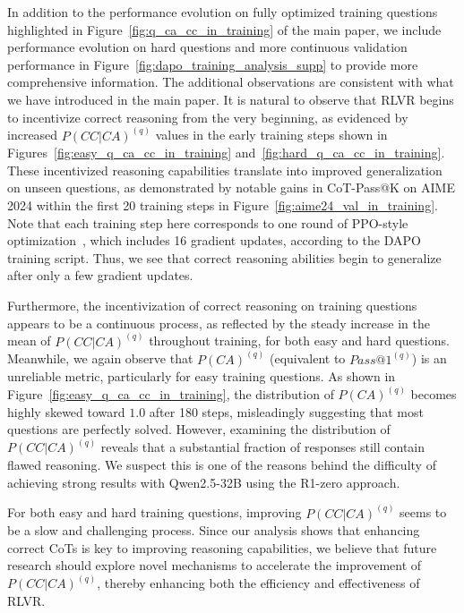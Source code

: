 In addition to the performance evolution on fully optimized training questions highlighted in Figure~\ref{fig:q_ca_cc_in_training} of the main paper, we include performance evolution on hard questions and more continuous validation performance in Figure~\ref{fig:dapo_training_analysis_supp} to provide more comprehensive information.
The additional observations are consistent with what we have introduced in the main paper.
It is natural to observe that RLVR begins to incentivize correct reasoning from the very beginning, as evidenced by increased $P(CC|CA)^{(q)}$ values in the early training steps shown in Figures~\ref{fig:easy_q_ca_cc_in_training} and~\ref{fig:hard_q_ca_cc_in_training}.
These incentivized reasoning capabilities translate into improved generalization on unseen questions, as demonstrated by notable gains in CoT-Pass@K on AIME 2024 within the first 20 training steps in Figure~\ref{fig:aime24_val_in_training}.
Note that each training step here corresponds to one round of PPO-style optimization~\citep{schulman2017PPO}, which includes 16 gradient updates, according to the DAPO training script.
Thus, we see that correct reasoning abilities begin to generalize after only a few gradient updates.

Furthermore, the incentivization of correct reasoning on training questions appears to be a continuous process, as reflected by the steady increase in the mean of $P(CC|CA)^{(q)}$ throughout training, for both easy and hard questions.
Meanwhile, we again observe that $P(CA)^{(q)}$ (equivalent to $Pass@1^{(q)}$) is an unreliable metric, particularly for easy training questions.
As shown in Figure~\ref{fig:easy_q_ca_cc_in_training}, the distribution of $P(CA)^{(q)}$ becomes highly skewed toward $1.0$ after 180 steps, misleadingly suggesting that most questions are perfectly solved.
However, examining the distribution of $P(CC|CA)^{(q)}$ reveals that a substantial fraction of responses still contain flawed reasoning.
We suspect this is one of the reasons behind the difficulty of achieving strong results with Qwen2.5-32B using the R1-zero approach.

For both easy and hard training questions, improving $P(CC|CA)^{(q)}$ seems to be a slow and challenging process. Since our analysis shows that enhancing correct CoTs is key to improving reasoning capabilities, we believe that future research should explore novel mechanisms to accelerate the improvement of $P(CC|CA)^{(q)}$, thereby enhancing both the efficiency and effectiveness of RLVR.
